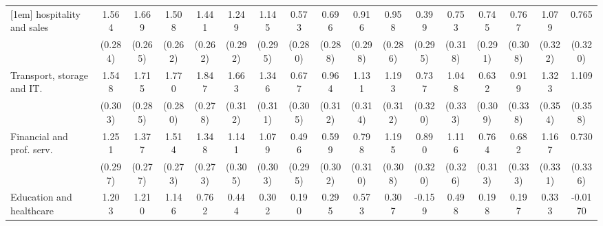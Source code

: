 {\begin{tabular}{l*{16}{c}}
[1em]
hospitality and sales&       1.564\sym{***}&       1.669\sym{***}&       1.508\sym{***}&       1.441\sym{***}&       1.249\sym{***}&       1.145\sym{***}&       0.573\sym{*}  &       0.696\sym{*}  &       0.916\sym{**} &       0.958\sym{***}&       0.399         &       0.753\sym{*}  &       0.745\sym{*}  &       0.767\sym{*}  &       1.079\sym{***}&       0.765\sym{*}  \\
                    &     (0.284)         &     (0.265)         &     (0.262)         &     (0.262)         &     (0.292)         &     (0.295)         &     (0.280)         &     (0.288)         &     (0.298)         &     (0.286)         &     (0.295)         &     (0.318)         &     (0.291)         &     (0.308)         &     (0.322)         &     (0.320)         \\
[1em]
Transport, storage and IT.&       1.548\sym{***}&       1.715\sym{***}&       1.770\sym{***}&       1.847\sym{***}&       1.663\sym{***}&       1.346\sym{***}&       0.677\sym{*}  &       0.964\sym{**} &       1.131\sym{***}&       1.193\sym{***}&       0.737\sym{*}  &       1.048\sym{**} &       0.632\sym{*}  &       0.919\sym{**} &       1.323\sym{***}&       1.109\sym{**} \\
                    &     (0.303)         &     (0.285)         &     (0.280)         &     (0.278)         &     (0.312)         &     (0.311)         &     (0.305)         &     (0.312)         &     (0.314)         &     (0.312)         &     (0.320)         &     (0.333)         &     (0.309)         &     (0.338)         &     (0.354)         &     (0.358)         \\
[1em]
Financial and prof. serv.&       1.251\sym{***}&       1.377\sym{***}&       1.514\sym{***}&       1.348\sym{***}&       1.141\sym{***}&       1.079\sym{***}&       0.496         &       0.599\sym{*}  &       0.798\sym{**} &       1.195\sym{***}&       0.890\sym{**} &       1.116\sym{***}&       0.764\sym{*}  &       0.682\sym{*}  &       1.167\sym{***}&       0.730\sym{*}  \\
                    &     (0.297)         &     (0.277)         &     (0.273)         &     (0.273)         &     (0.305)         &     (0.303)         &     (0.295)         &     (0.302)         &     (0.310)         &     (0.308)         &     (0.320)         &     (0.326)         &     (0.313)         &     (0.333)         &     (0.331)         &     (0.336)         \\
[1em]
Education and healthcare&       1.203\sym{***}&       1.210\sym{***}&       1.146\sym{***}&       0.762\sym{*}  &       0.444         &       0.302         &       0.190         &       0.295         &       0.573         &       0.307         &      -0.159         &       0.498         &       0.198         &       0.197         &       0.333         &     -0.0170         \\

\end{tabular}}
